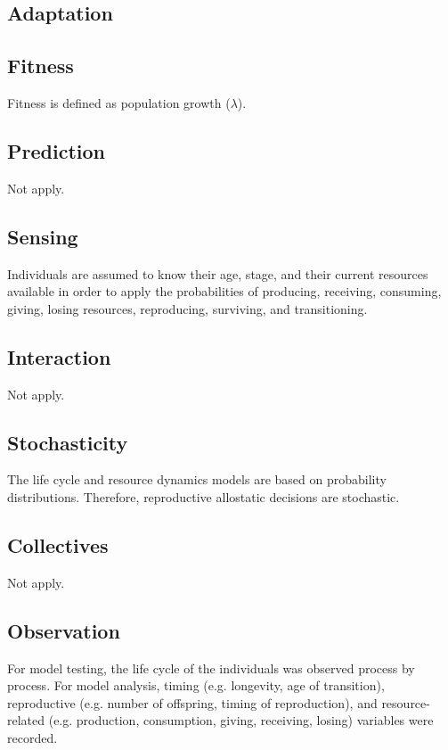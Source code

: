 \documentclass{article}
\begin{document}
\subsection{Adaptation}


\subsection{Fitness}

Fitness is defined as population growth ($\lambda$).

\subsection{Prediction}

Not apply.

\subsection{Sensing}

Individuals are assumed to know their age, stage, and their current resources available  in order to apply the probabilities of producing, receiving, consuming, giving, losing resources, reproducing, surviving, and transitioning.

\subsection{Interaction}

Not apply.

\subsection{Stochasticity}

The life cycle and resource dynamics models are based on probability distributions. Therefore, reproductive allostatic decisions are stochastic.

\subsection{Collectives}

Not apply.

\subsection{Observation}

For model testing, the life cycle of the individuals was observed process by process. For model analysis, timing (e.g. longevity, age of transition), reproductive (e.g. number of offspring, timing of reproduction), and resource-related (e.g. production, consumption, giving, receiving, losing) variables were recorded.
\end{document}
